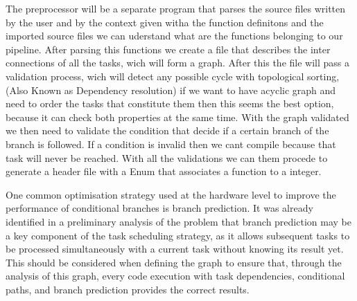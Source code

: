 The preprocessor will be a separate program that parses the source files written by the user and by the context given witha the function definitons and the imported source files we can uderstand what are the functions belonging to our pipeline. After parsing this functions we create a file that describes the inter connections of all the tasks, wich will form a graph.
After this the file will pass a validation process, wich will detect any possible cycle with topological sorting, (Also Known as Dependency resolution) if we want to have acyclic graph and need to order the tasks that constitute them then this seems the best option, because it can check both properties at the same time.
With the graph validated we then need to validate the condition that decide if a certain branch of the branch is followed. If a condition is invalid then we cant compile because that task will never be reached.
With all the validations we can them procede to generate a header file with a Enum that associates a function to a integer.






One common optimisation strategy used at the hardware level to improve the performance of conditional branches is branch prediction. It was already identified in a preliminary analysis of the problem that branch prediction may be a key component of the task scheduling strategy, as it allows subsequent tasks to be processed simultaneously with a current task without knowing its result yet. This should be considered when defining the graph to ensure that, through the analysis of this graph, every code execution with task dependencies, conditional paths, and branch prediction provides the correct results.


